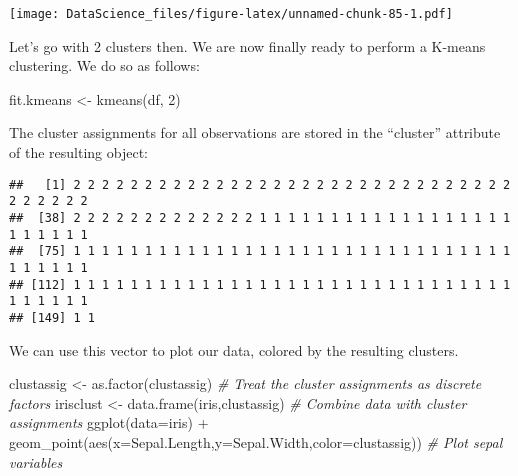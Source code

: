\documentclass[
]{book}
\newenvironment{Shaded}{\begin{snugshade}}{\end{snugshade}}
\newcommand{\AttributeTok}[1]{\textcolor[rgb]{0.77,0.63,0.00}{#1}}
\newcommand{\CommentTok}[1]{\textcolor[rgb]{0.56,0.35,0.01}{\textit{#1}}}
\newcommand{\DecValTok}[1]{\textcolor[rgb]{0.00,0.00,0.81}{#1}}
\newcommand{\FunctionTok}[1]{\textcolor[rgb]{0.00,0.00,0.00}{#1}}
\newcommand{\NormalTok}[1]{#1}
\newcommand{\OtherTok}[1]{\textcolor[rgb]{0.56,0.35,0.01}{#1}}
\newcommand{\SpecialCharTok}[1]{\textcolor[rgb]{0.00,0.00,0.00}{#1}}
\begin{document}
\texttt{[image: DataScience\_files/figure-latex/unnamed-chunk-85-1.pdf]}

Let's go with 2 clusters then. We are now finally ready to perform a K-means clustering. We do so as follows:

\begin{Shaded}
\begin{Highlighting}[]
\NormalTok{fit.kmeans }\OtherTok{\textless{}{-}} \FunctionTok{kmeans}\NormalTok{(df, }\DecValTok{2}\NormalTok{)}
\end{Highlighting}
\end{Shaded}

The cluster assignments for all observations are stored in the ``cluster'' attribute of the resulting object:

\begin{Shaded}
\end{Shaded}

\begin{verbatim}
##   [1] 2 2 2 2 2 2 2 2 2 2 2 2 2 2 2 2 2 2 2 2 2 2 2 2 2 2 2 2 2 2 2 2 2 2 2 2 2
##  [38] 2 2 2 2 2 2 2 2 2 2 2 2 2 1 1 1 1 1 1 1 1 1 1 1 1 1 1 1 1 1 1 1 1 1 1 1 1
##  [75] 1 1 1 1 1 1 1 1 1 1 1 1 1 1 1 1 1 1 1 1 1 1 1 1 1 1 1 1 1 1 1 1 1 1 1 1 1
## [112] 1 1 1 1 1 1 1 1 1 1 1 1 1 1 1 1 1 1 1 1 1 1 1 1 1 1 1 1 1 1 1 1 1 1 1 1 1
## [149] 1 1
\end{verbatim}

We can use this vector to plot our data, colored by the resulting clusters.

\begin{Shaded}
\begin{Highlighting}[]
\NormalTok{clustassig }\OtherTok{\textless{}{-}} \FunctionTok{as.factor}\NormalTok{(clustassig) }\CommentTok{\# Treat the cluster assignments as discrete factors}
\NormalTok{irisclust }\OtherTok{\textless{}{-}} \FunctionTok{data.frame}\NormalTok{(iris,clustassig) }\CommentTok{\# Combine data with cluster assignments}
\FunctionTok{ggplot}\NormalTok{(}\AttributeTok{data=}\NormalTok{iris) }\SpecialCharTok{+} \FunctionTok{geom\_point}\NormalTok{(}\FunctionTok{aes}\NormalTok{(}\AttributeTok{x=}\NormalTok{Sepal.Length,}\AttributeTok{y=}\NormalTok{Sepal.Width,}\AttributeTok{color=}\NormalTok{clustassig)) }\CommentTok{\# Plot sepal variables}
\end{Highlighting}
\end{Shaded}
\end{document}
